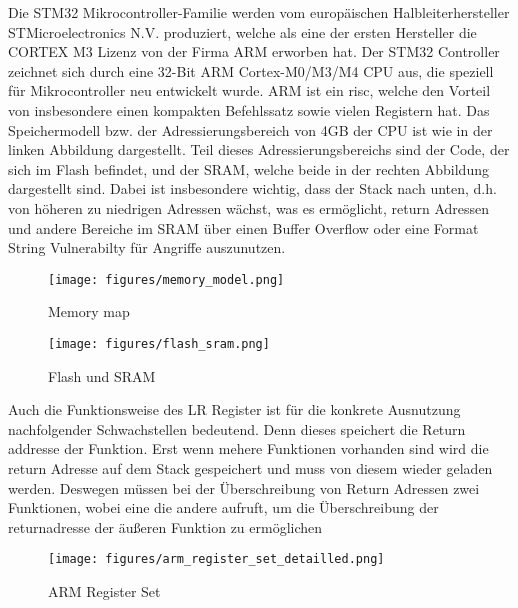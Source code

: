 \documentclass[a4paper,
DIV=13,
12pt,
BCOR=10mm,
department=FakIM,
oneside,
parskip=half,
automark,
listof=totocnumbered,
bibliography=totocnumbered,
acronym=totocnumbered
] {OTHRartcl}
\begin{document}
Die STM32 Mikrocontroller-Familie werden vom europäischen Halbleiterhersteller STMicroelectronics N.V. produziert, welche als eine der ersten Hersteller
die CORTEX M3 Lizenz von der Firma ARM erworben hat.
Der STM32 Controller zeichnet sich durch eine 32-Bit ARM Cortex-M0/M3/M4 CPU aus, die speziell für Mikrocontroller neu entwickelt wurde.
ARM ist ein \ac*{risc}, welche den Vorteil von insbesondere einen kompakten Befehlssatz sowie vielen Registern hat.
Das Speichermodell bzw. der Adressierungsbereich von 4GB der CPU ist wie in der linken Abbildung dargestellt.
Teil dieses Adressierungsbereichs sind der Code, der sich im Flash befindet, und der SRAM, welche beide in der rechten Abbildung dargestellt sind.
Dabei ist insbesondere wichtig, dass der Stack nach unten, d.h. von höheren zu niedrigen Adressen wächst, was es ermöglicht,
return Adressen und andere Bereiche im SRAM über einen Buffer Overflow oder eine Format String Vulnerabilty für Angriffe auszunutzen.
\begin{figure}[ht!]
  \begin{minipage}[b]{.45\linewidth}
    \texttt{[image: figures/memory\_model.png]}
    \caption{Memory map}
    \label{Abbildung 1: Memory map}
  \end{minipage}
  \hspace{.1\linewidth}
  \begin{minipage}[b]{.48\linewidth}
    \texttt{[image: figures/flash\_sram.png]}
    \caption{Flash und SRAM}
    \label{Abbildung 6: Flash und SRAM}
  \end{minipage}
\end{figure}

Auch die Funktionsweise des LR Register ist für die konkrete Ausnutzung nachfolgender Schwachstellen bedeutend.
Denn dieses speichert die Return addresse der Funktion. Erst wenn mehere Funktionen vorhanden sind wird die return Adresse auf dem Stack gespeichert und muss von
diesem wieder geladen werden. Deswegen müssen bei der Überschreibung von Return Adressen zwei Funktionen, wobei eine die andere aufruft, um die Überschreibung
der returnadresse der äußeren Funktion zu ermöglichen
\begin{figure}[ht!]
\begin{center}
  \texttt{[image: figures/arm\_register\_set\_detailled.png]}
  \caption{ARM Register Set}
  \label{Abbildung 1: ARM Register Set}
\end{center}
\end{figure}
\end{document}
